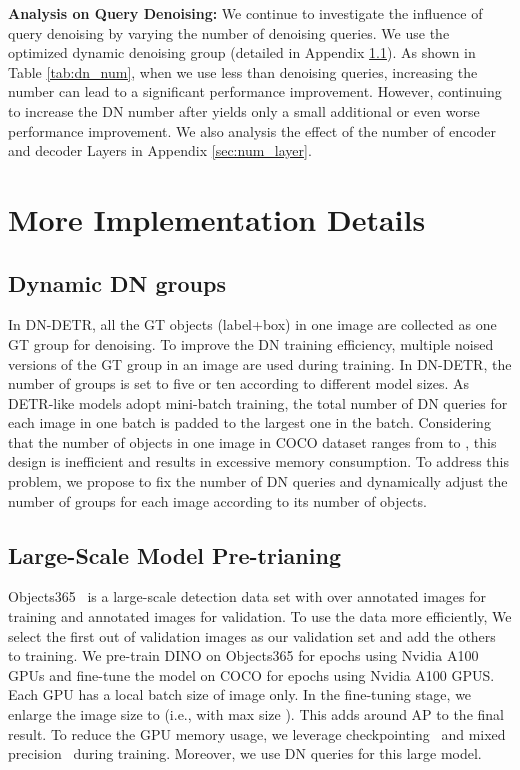 \documentclass[runningheads]{llncs}
\begin{document}
\textbf{Analysis on Query Denoising:} We continue to investigate the influence of query denoising by varying the number of denoising queries. We use the optimized dynamic denoising group (detailed in Appendix \ref{sec:ddg}). As shown in Table \ref{tab:dn_num}, when we use less than  denoising queries, increasing the number can lead to a significant performance improvement. However, continuing to increase the DN number after  yields only a small additional or even worse performance improvement. 
We also analysis the effect of the number of encoder and decoder Layers in Appendix \ref{sec:num_layer}.

\section{More Implementation Details}\label{sec:more_imp_details}
\subsection{Dynamic DN groups}\label{sec:ddg}
In DN-DETR, all the GT objects (label+box) in one image are collected as one GT group for denoising. To improve the DN training efficiency,  multiple noised versions of the GT group in an image are used during training. In DN-DETR, the number of groups is set to five or ten according to different model sizes. As DETR-like models adopt mini-batch training, the total number of DN queries for each image in one batch is padded to the largest one in the batch. Considering that the number of objects in one image in COCO dataset ranges from  to , this design is inefficient and results in excessive memory consumption. To address this problem, we propose to fix the number of DN queries and dynamically adjust the number of groups for each image according to its number of objects.

\subsection{Large-Scale Model Pre-trianing}
Objects365~\cite{shao2019objects365} is a large-scale detection data set with over  annotated images for training and  annotated images for validation. To use the data more efficiently, We select the first  out of  validation images as our validation set and add the others to training.
We pre-train DINO on Objects365 for  epochs using  Nvidia A100 GPUs and fine-tune the model on COCO for  epochs using  Nvidia A100 GPUS. Each GPU has a local batch size of  image only. In the fine-tuning stage, we enlarge the image size to  (i.e., with max size ). This adds around  AP to the final result. To reduce the GPU memory usage, we leverage checkpointing~\cite{chen2016training} and mixed precision~\cite{micikevicius2018mixed} during training. Moreover, we use  DN queries for this large model.
\end{document}
